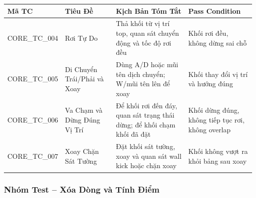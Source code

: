\documentclass[12pt,a4paper]{article}
\begin{document}
\begin{table}[H]
\centering
{}
\begin{tabularx}{\linewidth}{|l|X|X|X|}
\hline
\rowcolor{gray!35}
\textbf{Mã TC} & \textbf{Tiêu Đề} & \textbf{Kịch Bản Tóm Tắt} & \textbf{Pass Condition} \\ \hline
CORE\_TC\_004 & Rơi Tự Do                           & Thả khối từ vị trí top, quan sát chuyển động và tốc độ rơi đều & Khối rơi đều, không dừng sai chỗ \\ \hline
CORE\_TC\_005 & Di Chuyển Trái/Phải và Xoay         & Dùng A/D hoặc mũi tên dịch chuyển; W/mũi tên lên để xoay & Khối thay đổi vị trí và hướng đúng \\ \hline
CORE\_TC\_006 & Va Chạm và Dừng Đúng Vị Trí        & Để khối rơi đến đáy, quan sát trạng thái dừng; để khối chạm khối đã đặt & Khối dừng đúng, không tiếp tục rơi, không overlap \\ \hline
CORE\_TC\_007 & Xoay Chặn Sát Tường                 & Đặt khối sát tường, xoay và quan sát wall kick hoặc chặn xoay & Khối không vượt ra khỏi bảng sau xoay \\ \hline
\end{tabularx}
\end{table}

\subsubsection{Nhóm Test -- Xóa Dòng và Tính Điểm}
\end{document}

